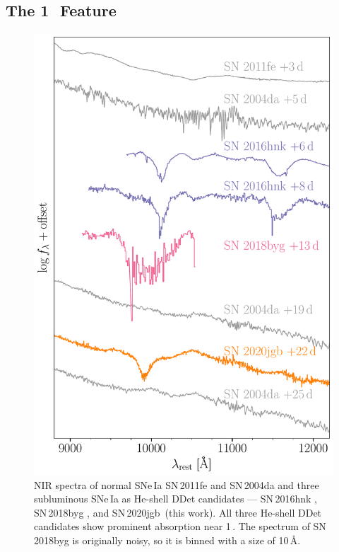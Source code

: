 \documentclass[twocolumn]{aastex631}
\newcommand{\sn}{SN\,2020jgb}
\begin{document}
\begin{CJK*}{UTF8}{gbsn}
\subsection{The 1\,\micron\ Feature} \label{sec:1um}
\begin{figure}
    \centering
    \includegraphics[width=\linewidth]{NIR_spec_comp.pdf}
    \caption{NIR spectra of normal SNe\,Ia SN\,2011fe \citep{Mazzali_2014} and SN\,2004da \citep{Marion2009_NIR} and three subluminous SNe\,Ia  as He-shell DDet candidates --- SN\,2016hnk \citep{galbany_16hnk_2019}, SN\,2018byg \citep{de_18byg_2019}, and \sn\ (this work). All three He-shell DDet candidates show prominent absorption near 1\,\micron. The spectrum of SN\,2018byg is originally noisy, so it is binned with a size of 10\,\AA.}
    \label{fig:NIR_comp}
\end{figure}


\end{CJK*}
\end{document}
